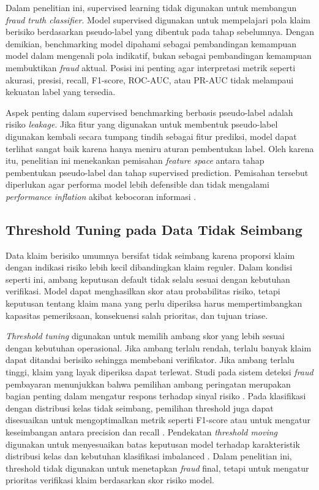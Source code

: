 Dalam penelitian ini, supervised learning tidak digunakan untuk membangun \emph{fraud truth classifier}. Model supervised digunakan untuk mempelajari pola klaim berisiko berdasarkan pseudo-label yang dibentuk pada tahap sebelumnya. Dengan demikian, benchmarking model dipahami sebagai pembandingan kemampuan model dalam mengenali pola indikatif, bukan sebagai pembandingan kemampuan membuktikan \emph{fraud} aktual. Posisi ini penting agar interpretasi metrik seperti akurasi, presisi, recall, F1-score, ROC-AUC, atau PR-AUC tidak melampaui kekuatan label yang tersedia.

Aspek penting dalam supervised benchmarking berbasis pseudo-label adalah risiko \emph{leakage}. Jika fitur yang digunakan untuk membentuk pseudo-label digunakan kembali secara tumpang tindih sebagai fitur prediksi, model dapat terlihat sangat baik karena hanya meniru aturan pembentukan label. Oleh karena itu, penelitian ini menekankan pemisahan \emph{feature space} antara tahap pembentukan pseudo-label dan tahap supervised prediction. Pemisahan tersebut diperlukan agar performa model lebih defensible dan tidak mengalami \emph{performance inflation} akibat kebocoran informasi \citep{kapoor2023leakage,samala2020leakage}.

\subsection{Threshold Tuning pada Data Tidak Seimbang}\label{threshold-tuning-pada-data-tidak-seimbang}

Data klaim berisiko umumnya bersifat tidak seimbang karena proporsi klaim dengan indikasi risiko lebih kecil dibandingkan klaim reguler. Dalam kondisi seperti ini, ambang keputusan default tidak selalu sesuai dengan kebutuhan verifikasi. Model dapat menghasilkan skor atau probabilitas risiko, tetapi keputusan tentang klaim mana yang perlu diperiksa harus mempertimbangkan kapasitas pemeriksaan, konsekuensi salah prioritas, dan tujuan triase.

\emph{Threshold tuning} digunakan untuk memilih ambang skor yang lebih sesuai dengan kebutuhan operasional. Jika ambang terlalu rendah, terlalu banyak klaim dapat ditandai berisiko sehingga membebani verifikator. Jika ambang terlalu tinggi, klaim yang layak diperiksa dapat terlewat. Studi pada sistem deteksi \emph{fraud} pembayaran menunjukkan bahwa pemilihan ambang peringatan merupakan bagian penting dalam mengatur respons terhadap sinyal risiko \citep{shen2020}. Pada klasifikasi dengan distribusi kelas tidak seimbang, pemilihan threshold juga dapat disesuaikan untuk mengoptimalkan metrik seperti F1-score atau untuk mengatur keseimbangan antara precision dan recall \citep{lipton2014thresholding}. Pendekatan \emph{threshold moving} digunakan untuk menyesuaikan batas keputusan model terhadap karakteristik distribusi kelas dan kebutuhan klasifikasi imbalanced \citep{zhang2020thresholdmoving}. Dalam penelitian ini, threshold tidak digunakan untuk menetapkan \emph{fraud} final, tetapi untuk mengatur prioritas verifikasi klaim berdasarkan skor risiko model.

